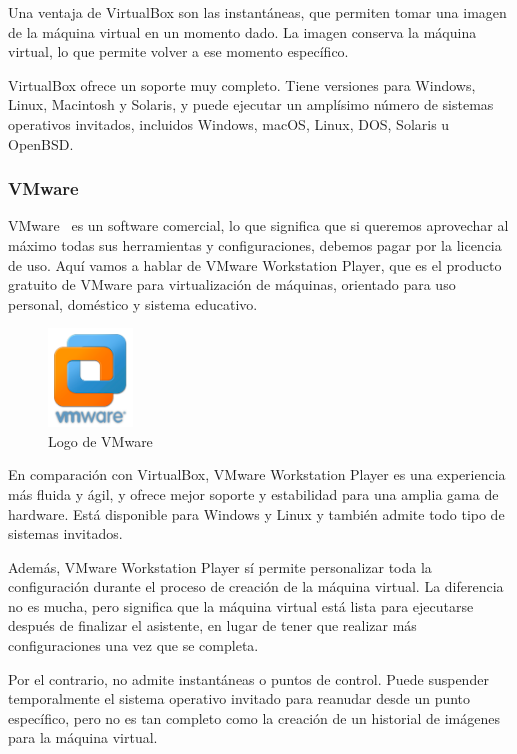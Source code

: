Una ventaja de VirtualBox son las instantáneas, que permiten tomar una imagen de la máquina virtual en un momento dado. La imagen conserva la máquina virtual, lo que permite volver a ese momento específico.

VirtualBox ofrece un soporte muy completo. Tiene versiones para Windows, Linux, Macintosh y Solaris, y puede ejecutar un amplísimo número de sistemas operativos invitados, incluidos Windows, macOS, Linux, DOS, Solaris u OpenBSD.

\subsubsection{VMware}
VMware~\cite{vmware} es un software comercial, lo que significa que si queremos aprovechar al máximo todas sus herramientas y configuraciones, debemos pagar por la licencia de uso. Aquí vamos a hablar de VMware Workstation Player, que es el producto gratuito de VMware para virtualización de máquinas, orientado para uso personal, doméstico y sistema educativo. 

\begin{figure}[h]
\centering
\includegraphics[width=0.2\textwidth]{../imgs/EdA/vmware.png}
\caption{Logo de VMware}
\label{fig:vmware}
\end{figure}

En comparación con VirtualBox, VMware Workstation Player es una experiencia más fluida y ágil, y ofrece mejor soporte y estabilidad para una amplia gama de hardware. Está disponible para Windows y Linux y también admite todo tipo de sistemas invitados.~\cite{versus}

Además, VMware Workstation Player sí permite personalizar toda la configuración durante el proceso de creación de la máquina virtual. La diferencia no es mucha, pero significa que la máquina virtual está lista para ejecutarse después de finalizar el asistente, en lugar de tener que realizar más configuraciones una vez que se completa.

Por el contrario, no admite instantáneas o puntos de control. Puede suspender temporalmente el sistema operativo invitado para reanudar desde un punto específico, pero no es tan completo como la creación de un historial de imágenes para la máquina virtual.

